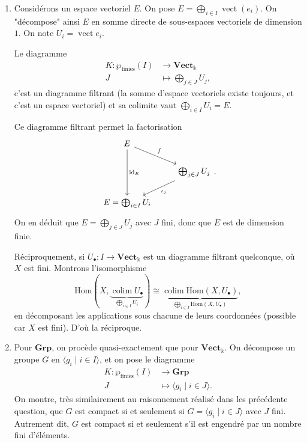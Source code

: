 \documentclass{../../td}
\newcommand\id{\ensuremath{\operatorname{id}}}
\newcommand\colim{\ensuremath{\operatorname{colim}}}
\begin{document}
\begin{enumerate}
    \item Considérons un espace vectoriel $E$.
      On pose $E = \bigoplus_{i \in I} \operatorname{vect}(e_i)$.
      On "décompose" ainsi $E$ en somme directe de sous-espaces vectoriels de dimension $1$.
      On note $U_i = \operatorname{vect} e_i$.

      Le diagramme \begin{align*}
        K: \wp_\text{finies}(I) &\longrightarrow \mathbf{Vect}_\mathds{k} \\
        J &\longmapsto \bigoplus_{j \in J} U_j
      ,\end{align*}
      c'est un diagramme filtrant (la somme d'espace vectoriels existe toujours, et c'est un espace vectoriel) et sa colimite vaut $\bigoplus_{i \in I} U_i = E$.

      Ce diagramme filtrant permet la factorisation
      \[
      \begin{tikzcd}
        E \arrow{dd}{\id_E} \arrow{dr}{f}\\
        & \bigoplus_{j \in J} U_j \arrow{dl}{\iota_j}\\
        E = \bigoplus_{i \in I} U_i
      \end{tikzcd}
      .\]
      On en déduit que $E = \bigoplus_{j \in J} U_j$ avec $J$ fini, donc que $E$ est de dimension finie.

      Réciproquement, si $U_\bullet : I \to \mathbf{Vect}_\mathds{k}$ est un diagramme filtrant quelconque, où $X$ est fini. Montrons l'isomorphisme \[
        \mathrm{Hom}(X, \underbrace{\colim U_\bullet}_{\bigoplus_{i \in  I} U_i}) \cong \underbrace{\colim \mathrm{Hom}(X, U_\bullet)}_{\bigoplus_{i \in  I} \mathrm{Hom}(X, U_\bullet)}
      ,\] en décomposant les applications sous chacune de leurs coordonnées (possible car $X$ est fini).
      D'où la réciproque.
    \item Pour $\mathbf{Grp}$, on procède quasi-exactement que pour $\mathbf{Vect}_\mathds{k}$.
      On décompose un groupe $G$ en $\langle g_i \mid i \in I \rangle$, et on pose le diagramme 
      \begin{align*}
        K: \wp_\text{finies}(I) &\longrightarrow \mathbf{Grp} \\
        J &\longmapsto \langle g_i  \mid i \in J \rangle
      .\end{align*}
      On montre, très similairement au raisonnement réalisé dans les précédente question, que $G$ est compact si et seulement si $G = \langle g_i  \mid i \in J \rangle$ avec $J$ fini.
      Autrement dit, $G$ est compact si et seulement s'il est engendré par un nombre fini d'éléments.
  \end{enumerate}
\end{document}
